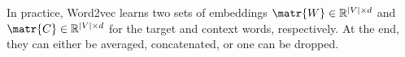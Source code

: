 \begin{description}
        \begin{remark}
            In practice, Word2vec learns two sets of embeddings $\matr{W} \in \mathbb{R}^{|V| \times d}$ and $\matr{C} \in \mathbb{R}^{|V| \times d}$ for the target and context words, respectively. At the end, they can either be averaged, concatenated, or one can be dropped.
        \end{remark}
\end{description}